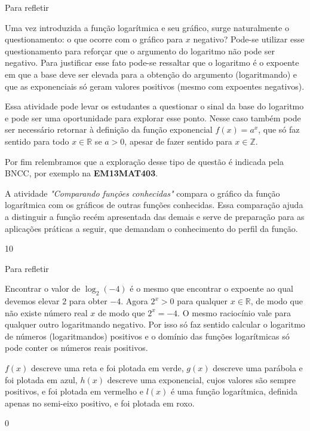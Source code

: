 \begin{sugestions}{Para refletir}
{
	Uma vez introduzida a função logarítmica e seu gráfico, surge naturalmente o questionamento: o que ocorre com o gráfico para $x$ negativo? Pode-se utilizar esse questionamento para reforçar que o argumento do logaritmo não pode ser negativo. Para justificar esse fato pode-se ressaltar que o logaritmo é o expoente em que a base deve ser elevada para a obtenção do argumento (logaritmando) e que as exponenciais só geram valores positivos (mesmo com expoentes negativos).

	Essa atividade pode levar os estudantes a questionar o sinal da base do logaritmo e pode ser uma oportunidade para explorar esse ponto. Nesse caso também pode ser necessário retornar à definição da função exponencial $f(x)=a^x$, que só faz sentido para todo $x \in \mathbb{R}$ se $a>0$, apesar de fazer sentido para $x \in \mathbb{Z}$.

	Por fim relembramos que a exploração desse tipo de questão é indicada pela BNCC, por exemplo na \textbf{EM13MAT403}.


	A atividade \textit{"Comparando funções conhecidas"} compara o gráfico da função logarítmica com os gráficos de outras funções conhecidas. Essa comparação ajuda a distinguir a função recém apresentada das demais e serve de preparação para as aplicações práticas a seguir, que demandam o conhecimento do perfil da função.
}{1}{0}
\end{sugestions}
\begin{answer}{Para refletir}
{
	Encontrar o valor de $\log_2 (-4)$ é o mesmo que encontrar o expoente ao qual devemos elevar $2$ para obter $-4$. Agora $2^x>0$ para qualquer $x \in \mathbb{R}$, de modo que não existe número real $x$ de modo que $2^x=-4$. O mesmo raciocínio vale para qualquer outro logaritmando negativo. Por isso só faz sentido calcular o logaritmo de números (logaritmandos) positivos e o domínio das funções logarítmicas só pode conter os números reais positivos.


	$f(x)$ descreve uma reta e foi plotada em verde, $g(x)$ descreve uma parábola e foi plotada em azul, $h(x)$ descreve uma exponencial, cujos valores são sempre positivos, e foi plotada em vermelho e $l(x)$ é uma função logarítmica, definida apenas no semi-eixo positivo, e foi plotada em roxo.
}{0}
\end{answer}

